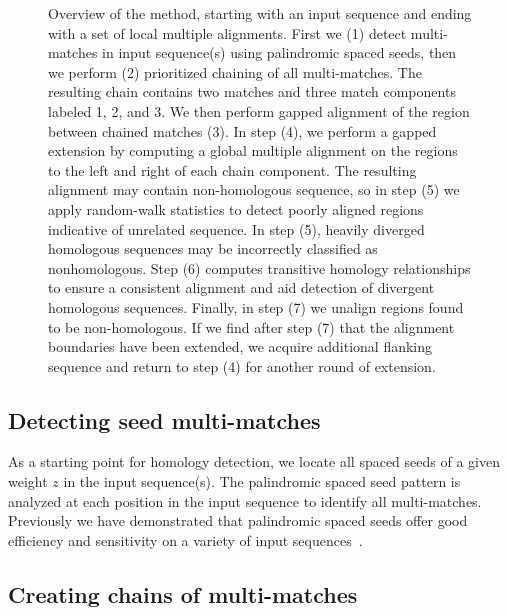 \documentclass{llncs}
\begin{document}
\begin{figure}[t]
\begin{center}
\end{center}
\caption{Overview of the method, starting with an input sequence and ending with a set of local multiple alignments. First we (1) detect multi-matches in input sequence(s) using palindromic spaced seeds, then we perform (2) prioritized chaining of all multi-matches.  The resulting chain contains two matches and three match components labeled 1, 2, and 3.  We then perform gapped alignment of the region between chained matches (3).   In step (4), we perform a gapped extension by computing a global multiple alignment on the regions to the left and right of each chain component.  The resulting alignment may contain non-homologous sequence, so in step (5) we apply random-walk statistics to detect poorly aligned regions indicative of unrelated sequence.  In step (5), heavily diverged homologous sequences may be incorrectly classified as nonhomologous.  Step (6) computes transitive homology relationships to ensure a consistent alignment and aid detection of divergent homologous sequences.  Finally, in step (7) we unalign regions found to be non-homologous.  If we find after step (7) that the alignment boundaries have been extended, we acquire additional flanking sequence and return to step (4) for another round of extension.}
\end{figure}



\subsection{Detecting seed multi-matches}

As a starting point for homology detection, we locate all spaced seeds of a given weight $z$ in the input sequence(s). The palindromic spaced seed pattern is analyzed at each position in the input sequence to identify all multi-matches.  Previously we have demonstrated that palindromic spaced seeds offer good efficiency and sensitivity on a variety of input sequences~\cite{ref-procrast}.

\subsection{Creating chains of multi-matches}
\end{document}
